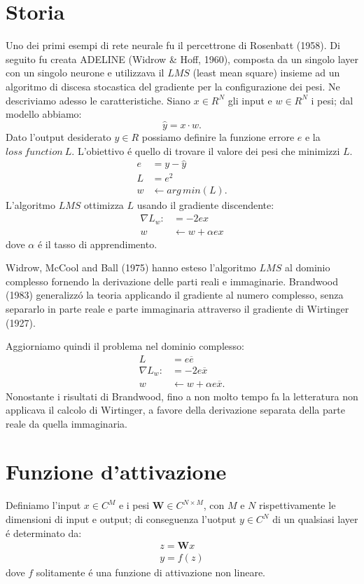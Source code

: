 \documentclass[a4paper,10pt]{article}
\date{15/05/2019}
\begin{document}
 \section{Storia}
 Uno dei primi esempi di rete neurale fu il percettrone di Rosenbatt (1958). Di seguito fu creata ADELINE (Widrow \& Hoff, 1960), composta da un singolo layer con un singolo neurone e utilizzava il $LMS$ (least mean square) insieme ad un algoritmo di discesa stocastica del gradiente per la configurazione dei pesi. Ne descriviamo adesso le caratteristiche. Siano $x \in R^N$ gli input e $w \in R^N$ i pesi; dal modello abbiamo:
 \begin{equation}
  \widehat{y} = x \cdot w.
 \end{equation}
Dato l'output desiderato $y \in R$ possiamo definire la funzione errore $e$ e la $loss \ function \ L$. L'obiettivo \'e quello di trovare il valore dei pesi che minimizzi $L$.
\begin{align}
 e &= y - \widehat{y}\\
 L &= e^2\\
 w &\leftarrow arg \, min(L).
\end{align}
L'algoritmo $LMS$ ottimizza $L$ usando il gradiente discendente:
\begin{align}
 \nabla L_w: &= -2ex\\
 w &\leftarrow w + \alpha ex
\end{align}
dove $\alpha$ \'e il tasso di apprendimento. 

Widrow, McCool and Ball (1975) hanno esteso l'algoritmo $LMS$ al dominio complesso fornendo la derivazione delle parti reali e immaginarie. Brandwood (1983) generalizz\'o la teoria applicando il gradiente al numero complesso, senza separarlo in parte reale e parte immaginaria attraverso il gradiente di Wirtinger (1927). 

Aggiorniamo quindi il problema nel dominio complesso:
\begin{align}
 L &= e \overline{e}\\
 \nabla L_w : &= -2e\overline{x}\\
 w &\leftarrow w + \alpha e \overline{x}.
\end{align}
Nonostante i risultati di Brandwood, fino a non molto tempo fa la letteratura non applicava il calcolo di Wirtinger, a favore della derivazione separata della parte reale da quella immaginaria. 

\section{Funzione d'attivazione}
Definiamo l'input $x \in C^M$ e i pesi $\textbf{W} \in C^{N\times M}$, con $M$ e $N$ rispettivamente le dimensioni di input e output; di conseguenza l'uotput $y \in C^N$ di un qualsiasi layer \'e determinato da:
\begin{align}
 z = \textbf{W} x\\
 y = f(z)
\end{align}
dove $f$ solitamente \'e una funzione di attivazione non lineare.
\end{document}
